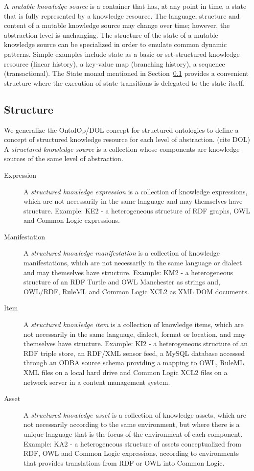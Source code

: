 \documentclass[runningheads]{llncs}
\begin{document}
A \emph{mutable knowledge source} is a container that has, at any point in time, a state that is fully represented by a knowledge resource. The language, structure and content of a mutable knowledge source may change over time; however, the abstraction level is unchanging. The structure of the state of a mutable knowledge source can be specialized in order to emulate common dynamic patterns. Simple examples include state as a basic or set-structured knowledge resource (linear history), a key-value map (branching history), a sequence (transactional). The State monad mentioned in Section~\ref{structure} provides a convenient structure where the execution of state transitions is delegated to the state itself.


\subsection{Structure}
\label{structure}
We generalize the OntoIOp/DOL concept for structured ontologies to define a concept of structured knowledge resource for each level of abstraction. (cite DOL) A \emph{structured knowledge source} is a collection whose components are knowledge sources of the same level of abstraction. 
\begin{description}
\item[Expression] A \emph{structured knowledge expression} is a collection of knowledge expressions, which are not necessarily in the same language and may themselves have structure. Example: KE2 - a heterogeneous structure of RDF graphs, OWL and Common Logic expressions.
\item[Manifestation] A \emph{structured knowledge manifestation} is a collection of knowledge manifestations, which are not necessarily in the same language or dialect and may themselves have structure. Example: KM2 -  a heterogeneous structure of an RDF Turtle and OWL Manchester as strings and, OWL/RDF, RuleML and Common Logic XCL2 as XML DOM documents.
\item[Item] A \emph{structured knowledge item} is a collection of knowledge items, which are not necessarily in the same language, dialect, format or location, and may themselves have structure. Example: KI2 -  a heterogeneous structure of an RDF triple store, an RDF/XML sensor feed, a MySQL database accessed through an ODBA source schema providing a mapping to OWL, RuleML XML files on a local hard drive and Common Logic XCL2 files on a network server in a content management system.
\item[Asset] A \emph{structured knowledge asset} is a collection of knowledge assets, which are not necessarily according to the same environment, but where there is a unique language that is the focus of the environment of each component. Example: KA2 - a heterogeneous structure of assets conceptualized from RDF, OWL and Common Logic expressions, according to environments that provides translations from RDF or OWL into Common Logic.
\end{description}
 
\end{document}
